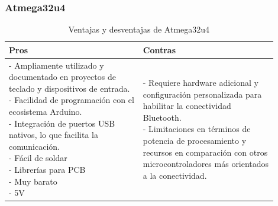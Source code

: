 \subsubsection{Atmega32u4}
\begin{table}[H]
\centering
\small
\begin{tabular}{|p{0.45\linewidth}|p{0.45\linewidth}|}
\hline
\textbf{Pros} &
\textbf{Contras} \\
\hline
\parbox[t]{\linewidth}{
\vspace{0.1cm}
- Ampliamente utilizado y documentado en proyectos de teclado y dispositivos de entrada. \medskip \\
- Facilidad de programación con el ecosistema Arduino. \medskip \\
- Integración de puertos \gls{USB} nativos, lo que facilita la comunicación. \medskip \\
- Fácil de soldar \medskip \\
- Librerías para \gls{PCB} \medskip \\
- Muy barato \medskip \\
- 5V \\
\vspace{0.1cm}
} &
\parbox[t]{\linewidth}{
\vspace{0.1cm}
- Requiere hardware adicional y configuración personalizada para habilitar la conectividad \gls{Bluetooth}. \medskip \\
- Limitaciones en términos de potencia de procesamiento y recursos en comparación con otros microcontroladores más orientados a la conectividad.} \medskip \\
\hline
\end{tabular}
\caption{Ventajas y desventajas de Atmega32u4}
\end{table}

